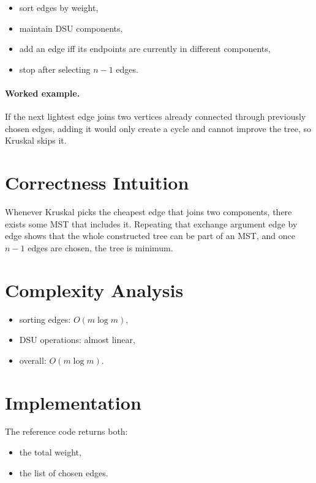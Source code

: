 \begin{itemize}
  \item sort edges by weight,
  \item maintain DSU components,
  \item add an edge iff its endpoints are currently in different components,
  \item stop after selecting \(n - 1\) edges.
\end{itemize}

\paragraph{Worked example.}
If the next lightest edge joins two vertices already connected through previously chosen edges, adding it would only
create a cycle and cannot improve the tree, so Kruskal skips it.

\section*{Correctness Intuition}

Whenever Kruskal picks the cheapest edge that joins two components, there exists some MST that includes it. Repeating
that exchange argument edge by edge shows that the whole constructed tree can be part of an MST, and once \(n - 1\)
edges are chosen, the tree is minimum.

\section*{Complexity Analysis}

\begin{itemize}
  \item sorting edges: \(O(m \log m)\),
  \item DSU operations: almost linear,
  \item overall: \(O(m \log m)\).
\end{itemize}

\section*{Implementation}

The reference code returns both:

\begin{itemize}
  \item the total weight,
  \item the list of chosen edges.
\end{itemize}

